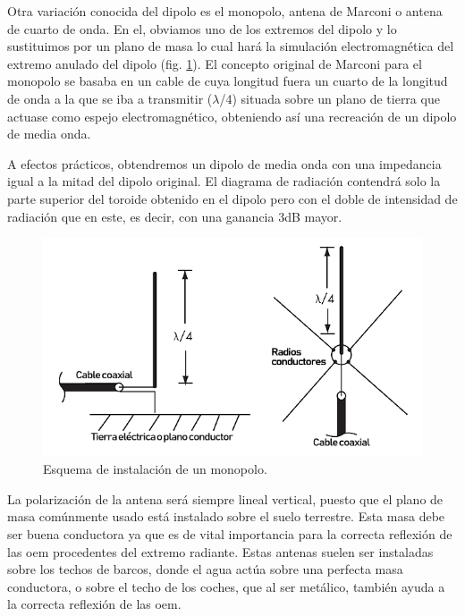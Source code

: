 \par Otra variación conocida del dipolo es el monopolo, antena de Marconi o antena de cuarto de onda. En el, obviamos uno de los extremos del dipolo y lo sustituimos por un plano de masa lo cual hará la simulación electromagnética del extremo anulado del dipolo (fig. \ref{fig:monopolo}). El concepto original de Marconi para el monopolo se basaba en un cable de cuya longitud fuera un cuarto de la longitud de onda a la que se iba a transmitir ($\lambda$/4) situada sobre un plano de tierra que actuase como espejo electromagnético, obteniendo así una recreación de un dipolo de media onda.
\\
\par A efectos prácticos, obtendremos un dipolo de media onda con una impedancia igual a la mitad del dipolo original. El diagrama de radiación contendrá solo la parte superior del toroide obtenido en el dipolo pero con el doble de intensidad de radiación que en este, es decir, con una ganancia 3dB mayor.
\\
\begin{figure}[h]
    \centering
        \includegraphics[width=14cm]{archivos/monopolo/monoesquema}
        \caption{Esquema de instalación de un monopolo. \citep{Frenzel2013}}
        \label{fig:monopolo}
\end{figure}

\par La polarización de la antena será siempre lineal vertical, puesto que el plano de masa comúnmente usado está instalado sobre el suelo terrestre. Esta masa debe ser buena conductora ya que es de vital importancia para la correcta reflexión de las \gls{oem} procedentes del extremo radiante. Estas antenas suelen ser instaladas sobre los techos de barcos, donde el agua actúa sobre una perfecta masa conductora, o sobre el techo de los coches, que al ser metálico, también ayuda a la correcta reflexión de las \gls{oem}. 
\\

